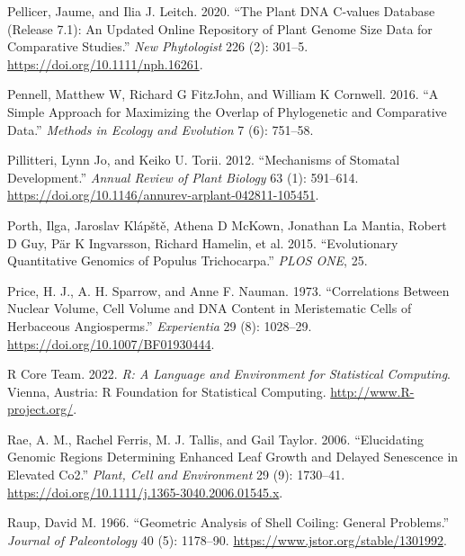 \documentclass[
  12pt,
]{article}
\newlength{\cslhangindent}
\newlength{\cslentryspacingunit} %
\newenvironment{CSLReferences}[2] %
 {%
  \setlength{\parindent}{0pt}
  \ifodd #1
  \let\oldpar\par
  \def\par{\hangindent=\cslhangindent\oldpar}
  \fi
  \setlength{\parskip}{#2\cslentryspacingunit}
 }%
 {}
\begin{document}
\begin{CSLReferences}{1}{0}
\leavevmode{}%
Pellicer, Jaume, and Ilia J. Leitch. 2020. {``The {Plant} {DNA} {C}‐values Database (Release 7.1): An Updated Online Repository of Plant Genome Size Data for Comparative Studies.''} \emph{New Phytologist} 226 (2): 301--5. \url{https://doi.org/10.1111/nph.16261}.

\leavevmode{}%
Pennell, Matthew W, Richard G FitzJohn, and William K Cornwell. 2016. {``A Simple Approach for Maximizing the Overlap of Phylogenetic and Comparative Data.''} \emph{Methods in Ecology and Evolution} 7 (6): 751--58.

\leavevmode{}%
Pillitteri, Lynn Jo, and Keiko U. Torii. 2012. {``Mechanisms of {Stomatal} {Development}.''} \emph{Annual Review of Plant Biology} 63 (1): 591--614. \url{https://doi.org/10.1146/annurev-arplant-042811-105451}.

\leavevmode{}%
Porth, Ilga, Jaroslav Klápště, Athena D McKown, Jonathan La Mantia, Robert D Guy, Pär K Ingvarsson, Richard Hamelin, et al. 2015. {``Evolutionary {Quantitative} {Genomics} of {Populus} Trichocarpa.''} \emph{PLOS ONE}, 25.

\leavevmode{}%
Price, H. J., A. H. Sparrow, and Anne F. Nauman. 1973. {``Correlations Between Nuclear Volume, Cell Volume and {DNA} Content in Meristematic Cells of Herbaceous Angiosperms.''} \emph{Experientia} 29 (8): 1028--29. \url{https://doi.org/10.1007/BF01930444}.

\leavevmode{}%
R Core Team. 2022. \emph{R: {A} {Language} and {Environment} for {Statistical} {Computing}}. Vienna, Austria: R Foundation for Statistical Computing. \url{http://www.R-project.org/}.

\leavevmode{}%
Rae, A. M., Rachel Ferris, M. J. Tallis, and Gail Taylor. 2006. {``Elucidating Genomic Regions Determining Enhanced Leaf Growth and Delayed Senescence in Elevated {Co2}.''} \emph{Plant, Cell and Environment} 29 (9): 1730--41. \url{https://doi.org/10.1111/j.1365-3040.2006.01545.x}.

\leavevmode{}%
Raup, David M. 1966. {``Geometric {Analysis} of {Shell} {Coiling}: {General} {Problems}.''} \emph{Journal of Paleontology} 40 (5): 1178--90. \url{https://www.jstor.org/stable/1301992}.


\end{CSLReferences}
\end{document}

